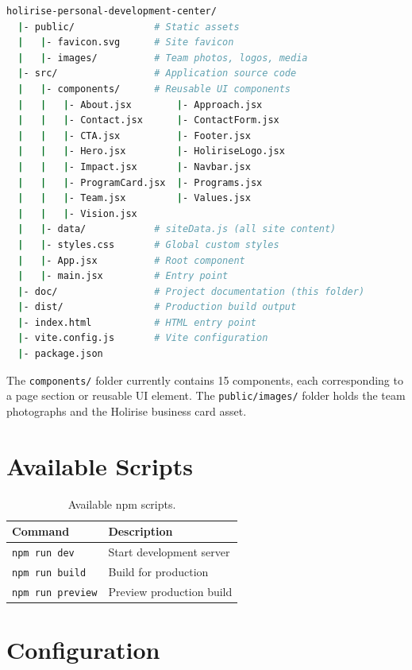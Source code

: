 \documentclass[11pt,a4paper]{article}
\begin{document}
\begin{codebox}
\begin{lstlisting}[language=bash]
holirise-personal-development-center/
  |- public/              # Static assets
  |   |- favicon.svg      # Site favicon
  |   |- images/          # Team photos, logos, media
  |- src/                 # Application source code
  |   |- components/      # Reusable UI components
  |   |   |- About.jsx        |- Approach.jsx
  |   |   |- Contact.jsx      |- ContactForm.jsx
  |   |   |- CTA.jsx          |- Footer.jsx
  |   |   |- Hero.jsx         |- HoliriseLogo.jsx
  |   |   |- Impact.jsx       |- Navbar.jsx
  |   |   |- ProgramCard.jsx  |- Programs.jsx
  |   |   |- Team.jsx         |- Values.jsx
  |   |   |- Vision.jsx
  |   |- data/            # siteData.js (all site content)
  |   |- styles.css       # Global custom styles
  |   |- App.jsx          # Root component
  |   |- main.jsx         # Entry point
  |- doc/                 # Project documentation (this folder)
  |- dist/                # Production build output
  |- index.html           # HTML entry point
  |- vite.config.js       # Vite configuration
  |- package.json
\end{lstlisting}
\end{codebox}

The \texttt{components/} folder currently contains 15 components,
each corresponding to a page section or reusable UI element.  The
\texttt{public/images/} folder holds the team photographs and the
Holirise business card asset.

\section{Available Scripts}

\begin{table}[h]
\centering
\begin{tabular}{@{}ll@{}}
\toprule
\textbf{Command} & \textbf{Description} \\
\midrule
\texttt{npm run dev}    & Start development server \\
\texttt{npm run build}  & Build for production \\
\texttt{npm run preview}& Preview production build \\
\bottomrule
\end{tabular}
\caption{Available npm scripts.}
\end{table}

\section{Configuration}
\end{document}
